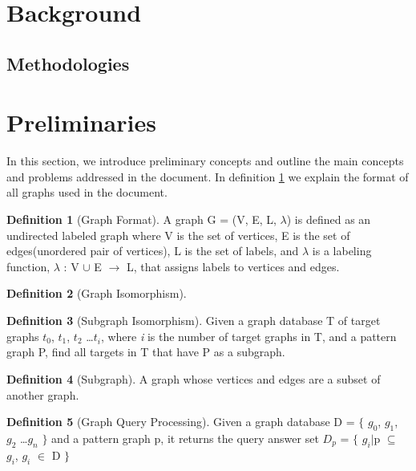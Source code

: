 \documentclass{l4proj}
\theoremstyle{definition}
\newtheorem{myDef}{Definition}
\begin{document}
    \section{Background}
        \subsection{Methodologies}
    \section{Preliminaries}
        In this section, we introduce preliminary concepts and outline the main concepts and problems addressed in the document. In definition \ref{def:graphFormat} we explain the format of all graphs used in the document.

        \begin{myDef}[Graph Format]
        \label{def:graphFormat}
        A graph G = (V, E, L, $\lambda$) is defined as an undirected labeled graph where V is the set of vertices, E is the set of edges(unordered pair of vertices), L is the set of labels, and $\lambda$ is a labeling function, $\lambda$ : V $\cup$ E $\rightarrow$ L, that assigns labels to vertices and edges.
        \end{myDef}
        
        \begin{myDef}[Graph Isomorphism]
        
        \end{myDef}

        \begin{myDef}[Subgraph Isomorphism]
        \label{def:subgraphIsomorphism}
        Given a graph database T of target graphs $t^{}_0$, $t^{}_1$, $t^{}_2$ \ldots $t^{}_i$, where \textit{i} is the number of target graphs in T, and a pattern graph P, find all targets in T that have P as a subgraph.
        \end{myDef}
        
        \begin{myDef}[Subgraph]
        \label{def:subgraph}
        A graph whose vertices and edges are a subset of another graph.
        \end{myDef}
        
        \begin{myDef}[Graph Query Processing]
        \label{def:graphQueryProcessing}
        Given a graph database D = $\{$ $g^{}_0$, $g^{}_1$, $g^{}_2$ \ldots $g^{}_n$ $\}$ and a pattern graph p, it returns the query answer set $D^{}_p$ = $\{$ $g^{}_i$$\vert$p $\subseteq$ $g^{}_i$, $g^{}_i$ $\in$ D $\}$
        
        \end{myDef}
        
\end{document}
